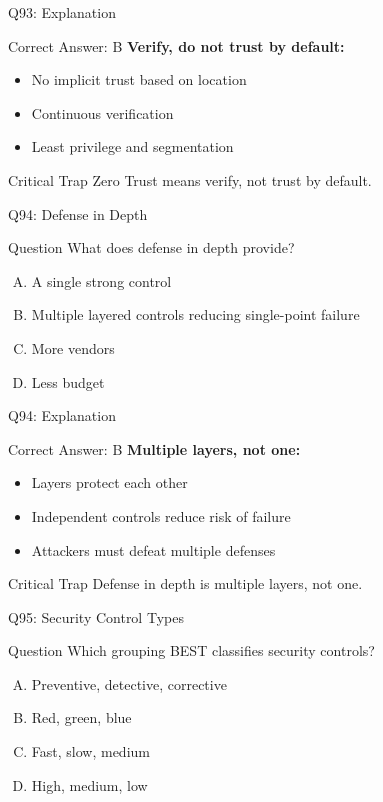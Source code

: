 \documentclass{beamer}
\begin{document}
	\begin{frame}{Q93: Explanation}
		\begin{block}{Correct Answer: B}
			\textbf{Verify, do not trust by default:}
			\begin{itemize}
				\item No implicit trust based on location
				\item Continuous verification
				\item Least privilege and segmentation
			\end{itemize}
		\end{block}
		\begin{alertblock}{Critical Trap}
			Zero Trust means verify, not trust by default.
		\end{alertblock}
	\end{frame}
	
	\begin{frame}{Q94: Defense in Depth}
		\begin{block}{Question}
			What does defense in depth provide?
		\end{block}
		\begin{enumerate}[(A)]
			\item A single strong control
			\item Multiple layered controls reducing single-point failure
			\item More vendors
			\item Less budget
		\end{enumerate}
	\end{frame}
	
	\begin{frame}{Q94: Explanation}
		\begin{block}{Correct Answer: B}
			\textbf{Multiple layers, not one:}
			\begin{itemize}
				\item Layers protect each other
				\item Independent controls reduce risk of failure
				\item Attackers must defeat multiple defenses
			\end{itemize}
		\end{block}
		\begin{alertblock}{Critical Trap}
			Defense in depth is multiple layers, not one.
		\end{alertblock}
	\end{frame}
	
	\begin{frame}{Q95: Security Control Types}
		\begin{block}{Question}
			Which grouping BEST classifies security controls?
		\end{block}
		\begin{enumerate}[(A)]
			\item Preventive, detective, corrective
			\item Red, green, blue
			\item Fast, slow, medium
			\item High, medium, low
		\end{enumerate}
	\end{frame}
	
\end{document}

